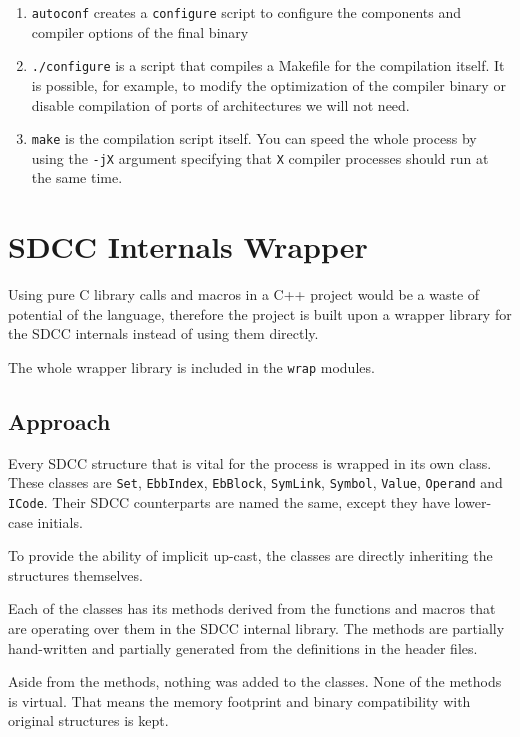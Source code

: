         \begin{enumerate}
        \item \texttt{autoconf} creates a \texttt{configure} script to configure the components and compiler options of the final binary
        \item \texttt{./configure} is a script that compiles a Makefile for the compilation itself. It is possible, for example, to modify the optimization of the compiler binary or disable compilation of ports of architectures we will not need.
        \item \texttt{make} is the compilation script itself. You can speed the whole process by using the \texttt{-jX} argument specifying that \texttt{X} compiler processes should run at the same time.
        \end{enumerate}

    \section{SDCC Internals Wrapper}

    Using pure C library calls and macros in a C++ project would be a waste of potential of the language, therefore the project is built upon a wrapper library for the SDCC internals instead of using them directly.

    The whole wrapper library is included in the \texttt{wrap} modules.

        \subsection{Approach}

            Every SDCC structure that is vital for the process is wrapped in its own class. These classes are \texttt{Set}, \texttt{EbbIndex}, \texttt{EbBlock}, \texttt{SymLink}, \texttt{Symbol}, \texttt{Value}, \texttt{Operand} and \texttt{ICode}. Their SDCC counterparts are named the same, except they have lower-case initials.

            To provide the ability of implicit up-cast, the classes are directly inheriting the structures themselves.

            Each of the classes has its methods derived from the functions and macros that are operating over them in the SDCC internal library. The methods are partially hand-written and partially generated from the definitions in the header files.

            Aside from the methods, nothing was added to the classes. None of the methods is virtual. That means the memory footprint and binary compatibility with original structures is kept.

